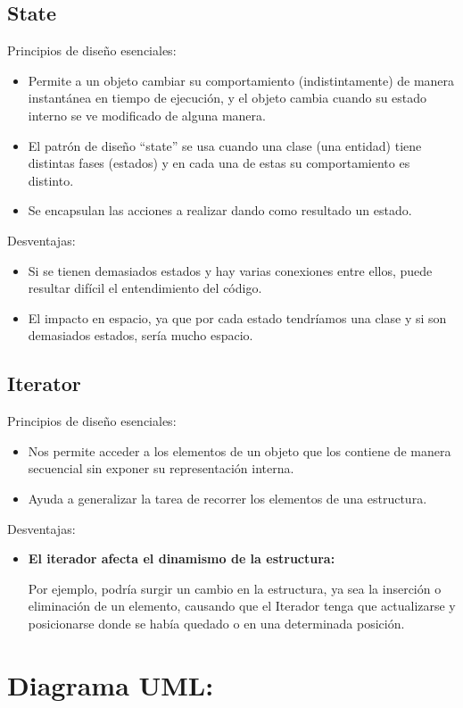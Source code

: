 \documentclass{article}
\begin{document}
\subsection*{State}
Principios de diseño esenciales:
\begin{itemize}
\item Permite a un objeto cambiar su comportamiento (indistintamente) de manera instantánea
  en tiempo de ejecución, y el objeto cambia cuando su estado interno se ve modificado de
  alguna manera.
\item El patrón de diseño “state” se usa cuando una clase (una entidad) tiene distintas fases
  (estados) y en cada una de estas su comportamiento es distinto.
\item Se encapsulan las acciones a realizar dando como resultado un estado.
\end{itemize}

Desventajas:
\begin{itemize}
\item Si se tienen demasiados estados y hay varias conexiones entre ellos, puede
  resultar difícil el entendimiento del código.
\item El impacto en espacio, ya que por cada estado tendríamos una clase y si son
  demasiados estados, sería mucho espacio.
\end{itemize}

\subsection*{Iterator}
Principios de diseño esenciales:
\begin{itemize}
\item Nos permite acceder a los elementos de un objeto que los contiene de manera
  secuencial sin exponer su representación interna.
\item Ayuda a generalizar la tarea de recorrer los elementos de una estructura.
\end{itemize}

Desventajas:
\begin{itemize}
\item \textbf{El iterador afecta el dinamismo de la estructura:}
  
  Por ejemplo, podría surgir un cambio en la estructura, ya sea la inserción
  o eliminación de un elemento, causando que el Iterador tenga que actualizarse
  y posicionarse donde se había quedado o en una determinada posición.
\end{itemize}

\section*{Diagrama UML:}
\end{document}
